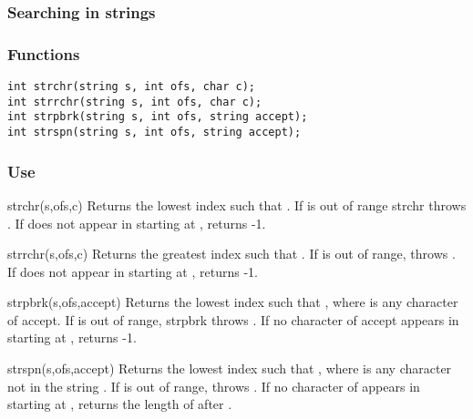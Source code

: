 \subsubsection*{Searching in strings}
\subsubsection*{Functions}
\begin{verbatim}
int strchr(string s, int ofs, char c);
int strrchr(string s, int ofs, char c);
int strpbrk(string s, int ofs, string accept);
int strspn(string s, int ofs, string accept);
\end{verbatim}

\subsubsection*{Use}

\begin{defun}{strchr}{(s,ofs,c)}
Returns the lowest index  such that
.  If  is out of range strchr
throws .  If  does not
appear in  starting at ,  returns -1.
\end{defun}

\begin{defun}{strrchr}{(s,ofs,c)}
Returns the greatest index  such that
.  If  is out of range,
 throws .  If
 does not appear in  starting at , 
returns -1.
\end{defun}

\begin{defun}{strpbrk}{(s,ofs,accept)}
Returns the lowest index  such that
, where  is any character of
accept.  If  is out of range, strpbrk throws
.  If no character of accept
appears in  starting at ,  returns -1.
\end{defun}

\begin{defun}{strspn}{(s,ofs,accept)}
Returns the lowest index  such that
, where  is any character not
in the string .  If  is out of range, 
throws .  If no character of
 appears in  starting at , 
returns the length of  after .
\end{defun}


